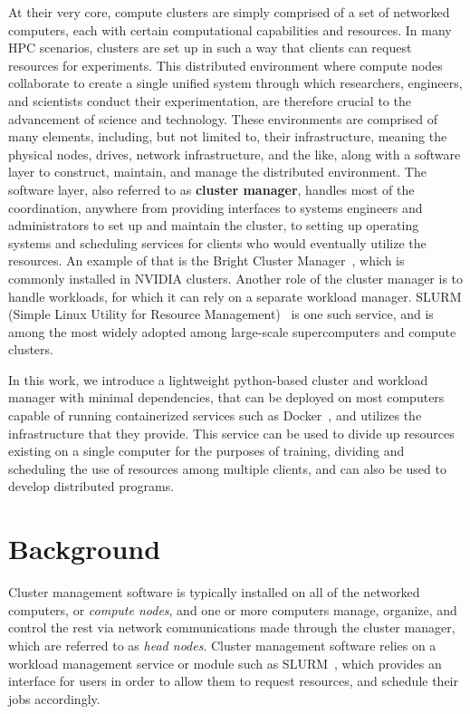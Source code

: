 \documentclass[sigconf]{acmart}
\begin{document}
At their very core, compute clusters are simply comprised of a set of networked computers, 
each with certain computational capabilities and resources.
In many HPC scenarios, clusters are set up in such a way that clients can request resources for experiments.
This distributed environment where compute nodes collaborate to create a single unified system through which researchers, 
engineers, and scientists conduct their experimentation, are therefore crucial to the advancement of science and technology.
These environments are comprised of many elements, including, but not limited to, their infrastructure, meaning the physical
nodes, drives, network infrastructure, and the like, along with a software layer to construct, maintain, and manage the 
distributed environment.
The software layer, also referred to as \textbf{cluster manager}, handles most of the coordination, anywhere from providing 
interfaces to systems engineers and administrators to set up and maintain the cluster, to setting up operating systems and 
scheduling services for clients who would eventually utilize the resources.
An example of that is the Bright Cluster Manager~\cite{bright}, which is commonly installed in NVIDIA clusters.
Another role of the cluster manager is to handle workloads, for which it can rely on a separate workload manager.
SLURM (Simple Linux Utility for Resource Management)~\cite{yoo2003slurm} is one such service, and is among the most widely 
adopted among large-scale supercomputers and compute clusters.

In this work, we introduce a lightweight python-based cluster and workload manager with minimal dependencies, that can be
deployed on most computers capable of running containerized services such as Docker~\cite{merkel2014docker}, and utilizes the
infrastructure that they provide.
This service can be used to divide up resources existing on a single computer for the purposes of training, dividing and
scheduling the use of resources among multiple clients, and can also be used to develop distributed programs.

\section{Background}

Cluster management software is typically installed on all of the networked computers, or \textit{compute nodes}, 
and one or more computers manage, organize, and control the rest via network communications made through the cluster manager, 
which are referred to as \textit{head nodes}.
Cluster management software relies on a workload management service or module such as SLURM~\cite{yoo2003slurm}, which provides 
an interface for users in order to allow them to request resources, and schedule their jobs accordingly.
\end{document}
